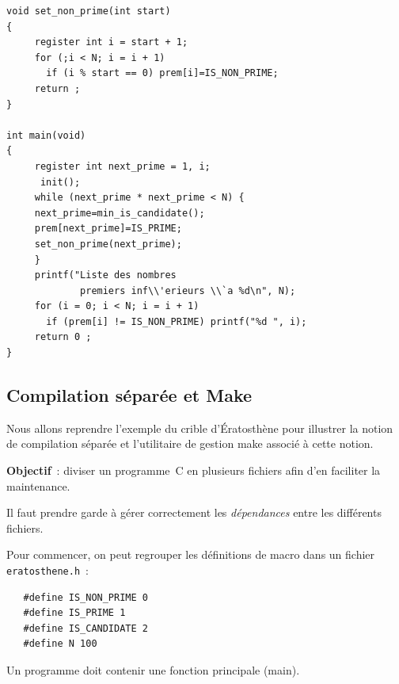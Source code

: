 \begin{frame}[fragile]

\begin{verbatim}
void set_non_prime(int start) 
{
     register int i = start + 1;
     for (;i < N; i = i + 1)
       if (i % start == 0) prem[i]=IS_NON_PRIME;
     return ;
}

int main(void) 
{
     register int next_prime = 1, i;
      init();
     while (next_prime * next_prime < N) {
     next_prime=min_is_candidate();
     prem[next_prime]=IS_PRIME;
     set_non_prime(next_prime);
     }
     printf("Liste des nombres 
             premiers inf\\'erieurs \\`a %d\n", N);
     for (i = 0; i < N; i = i + 1)
       if (prem[i] != IS_NON_PRIME) printf("%d ", i);
     return 0 ;
}
\end{verbatim}
\end{frame}
\begin{frame}[fragile]
  \section{Compilation s\'epar\'ee et Make}%
  Nous allons reprendre l'exemple du crible d'\'Eratosth\`ene pour
  illustrer la notion de compilation s\'epar\'ee et l'utilitaire de
  gestion make associ\'e \`a cette notion.
  \par\medskip
  \textbf{Objectif}~: diviser un programme~C en plusieurs fichiers
  afin d'en faciliter la maintenance.
  \par\medskip
  Il faut prendre garde \`a g\'erer correctement les
  \textit{d\'ependances} entre les diff\'erents fichiers.
  \par\medskip
  Pour commencer, on peut regrouper les d\'efinitions de macro dans un
  fichier \texttt{eratosthene.h}~:
\begin{verbatim}
   #define IS_NON_PRIME 0
   #define IS_PRIME 1
   #define IS_CANDIDATE 2
   #define N 100
\end{verbatim}
  Un programme doit contenir une fonction principale (main).
\end{frame}
